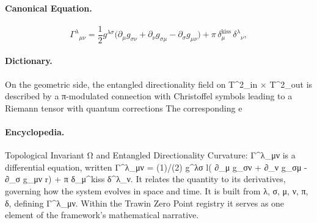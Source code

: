 \paragraph{Canonical Equation.}
\[
\Gamma^{\lambda}{}_{\mu\nu} = \frac{1}{2} g^{\lambda\sigma} \bigl( \partial_{\mu} g_{\sigma\nu} + \partial_{\nu} g_{\sigma\mu} - \partial_{\sigma} g_{\mu\nu} \bigr) + \pi\,\delta_{\mu}^{\mathrm{kiss}}\, \delta^{\lambda}{}_{\nu},
\]

\paragraph{Dictionary.}
On the geometric side, the entangled directionality field on T\textasciicircum{}2\_in × T\textasciicircum{}2\_out is described by a π-modulated connection with Christoffel symbols leading to a Riemann tensor with quantum corrections The corresponding e

\paragraph{Encyclopedia.}
Topological Invariant Ω and Entangled Directionality Curvature: Γ\textasciicircum{}λ\_μν is a differential equation, written Γ\textasciicircum{}λ\_μν = (1)/(2) g\textasciicircum{}λσ l( ∂\_μ g\_σν + ∂\_ν g\_σμ - ∂\_σ g\_μν r) + π δ\_μ\textasciicircum{}kiss δ\textasciicircum{}λ\_ν. It relates the quantity to its derivatives, governing how the system evolves in space and time. It is built from λ, σ, μ, ν, π, δ, defining Γ\textasciicircum{}λ\_μν. Within the Trawin Zero Point registry it serves as one element of the framework's mathematical narrative.
